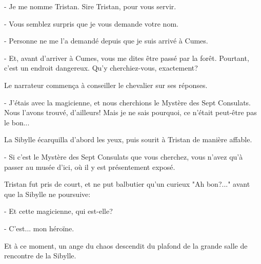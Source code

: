 \documentclass[a4paper,11pt, openany]{book}
\begin{document}
- Je me nomme Tristan. Sire Tristan, pour vous servir.

- Vous semblez surpris que je vous demande votre nom.

- Personne ne me l'a demandé depuis que je suis arrivé à Cumes. 

- Et, avant d'arriver à Cumes, vous me dites être passé par la forêt. Pourtant, c'est un endroit dangereux. Qu'y cherchiez-vous, exactement?

Le narrateur commença à conseiller le chevalier sur ses réponses.

- J'étais avec la magicienne, et nous cherchions le Mystère des Sept Consulats. Nous l'avons trouvé, d'ailleurs! Mais je ne sais pourquoi, ce n'était peut-être pas le bon...

La Sibylle écarquilla d'abord les yeux, puis sourit à Tristan de manière affable.

- Si c'est le Mystère des Sept Consulats que vous cherchez, vous n'avez qu'à passer au musée d'ici, où il y est présentement exposé.

Tristan fut pris de court, et ne put balbutier qu'un curieux "Ah bon?..." avant que la Sibylle ne poursuive:

- Et cette magicienne, qui est-elle?

- C'est... mon héroïne.

Et à ce moment, un ange du chaos descendit du plafond de la grande salle de rencontre de la Sibylle.
\end{document}
